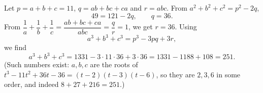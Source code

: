 Let $p=a+b+c=11$, $q=ab+bc+ca$ and $r=abc$. From $a^2+b^2+c^2=p^2-2q$,
\[49=121-2q,\qquad q=36.\]
From $\dfrac{1}{a}+\dfrac{1}{b}+\dfrac{1}{c}=\dfrac{ab+bc+ca}{abc}=\dfrac {q}{r}=1$, we get $r=36$. Using
\[a^3+b^3+c^3=p^3-3pq+3r,\]
we find
\[a^3+b^3+c^3=1331-3\cdot11\cdot36+3\cdot36=1331-1188+108=\boxed{251}.\]
(Such numbers exist: $a,b,c$ are the roots of $t^3-11t^2+36t-36=(t-2)(t-3)(t-6)$, so they are $2,3,6$ in some order, and indeed $8+27+216=251$.)
